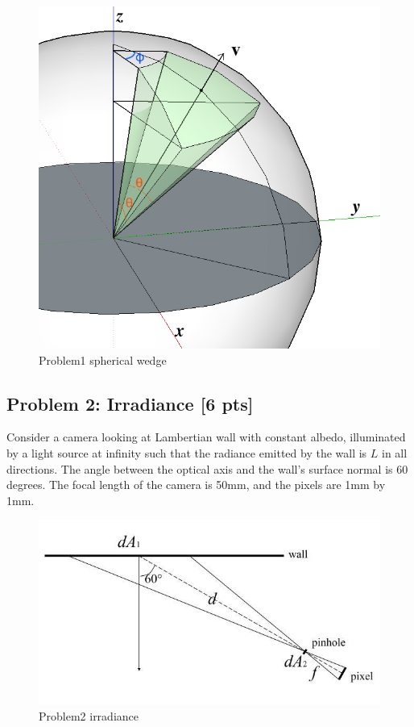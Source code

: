 \documentclass[11pt]{article}
\makeatletter
\def\maxwidth{\ifdim\Gin@nat@width>\linewidth\linewidth
    \else\Gin@nat@width\fi}
\let\Oldincludegraphics\includegraphics
\renewcommand{\includegraphics}[1]{\Oldincludegraphics[width=.8\maxwidth]{#1}}
\makeatother
\begin{document}
\begin{figure}
\centering
\includegraphics{Problem1 spherical wedge.jpg}
\caption{Problem1 spherical wedge}
\end{figure}

    \subsection{Problem 2: Irradiance {[}6
pts{]}}\label{problem-2-irradiance-6-pts}

Consider a camera looking at Lambertian wall with constant albedo,
illuminated by a light source at infinity such that the radiance emitted
by the wall is \(L\) in all directions. The angle between the optical
axis and the wall's surface normal is 60 degrees. The focal length of
the camera is 50mm, and the pixels are 1mm by 1mm.

\begin{figure}
\centering
\includegraphics{Problem2 irradiance.jpg}
\caption{Problem2 irradiance}
\end{figure}
\end{document}
